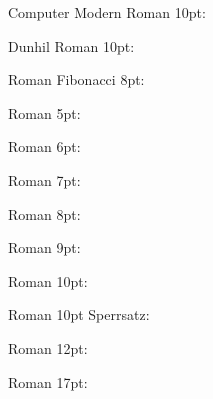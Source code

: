 \documentclass[10pt,a4paper]{article}
\newcommand{\Ligature}{%

}
\begin{document}
Computer Modern Roman 10pt:\\{\Ligature}

Dunhil Roman 10pt:\\{\oldunh \Ligature}

Roman Fibonacci 8pt:\\{\olfib \Ligature}

Roman 5pt:\\{\olrfive \Ligature}

Roman 6pt:\\{\olrsix \Ligature}

Roman 7pt:\\{\olrseven \Ligature}

Roman 8pt:\\{\olreight \Ligature}

Roman 9pt:\\{\olrnine \Ligature}

Roman 10pt:\\{\olrten \Ligature}

Roman 10pt Sperrsatz:\\{\olrtens \Ligature}

Roman 12pt:\\{\olrtwelve \Ligature}

Roman 17pt:\\{\olrseventeen \Ligature}
\end{document}
